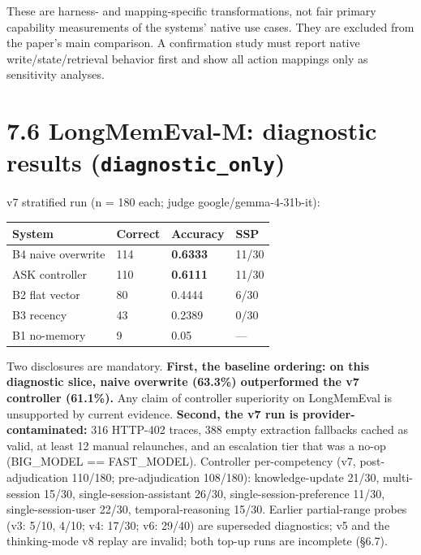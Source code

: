 These are harness- and mapping-specific transformations, not fair
primary capability measurements of the systems' native use cases. They
are excluded from the paper's main comparison. A confirmation study must
report native write/state/retrieval behavior first and show all action
mappings only as sensitivity analyses.

\section{\texorpdfstring{7.6 LongMemEval-M: diagnostic results
(\texttt{diagnostic\_only})}{7.6 LongMemEval-M: diagnostic results (diagnostic\_only)}}\label{longmemeval-m-diagnostic-results-diagnostic_only}

v7 stratified run (n = 180 each; judge google/gemma-4-31b-it):

{\def\LTcaptype{none} %
\begin{longtable}[]{@{}llll@{}}
\toprule\noalign{}
System & Correct & Accuracy & SSP \\
\midrule\noalign{}
\endhead
\bottomrule\noalign{}
\endlastfoot
B4 naive overwrite & 114 & \textbf{0.6333} & 11/30 \\
ASK controller & 110 & \textbf{0.6111} & 11/30 \\
B2 flat vector & 80 & 0.4444 & 6/30 \\
B3 recency & 43 & 0.2389 & 0/30 \\
B1 no-memory & 9 & 0.05 & --- \\
\end{longtable}
}

Two disclosures are mandatory. \textbf{First, the baseline ordering: on
this diagnostic slice, naive overwrite (63.3\%) outperformed the v7
controller (61.1\%).} Any claim of controller superiority on LongMemEval
is unsupported by current evidence. \textbf{Second, the v7 run is
provider-contaminated:} 316 HTTP-402 traces, 388 empty extraction
fallbacks cached as valid, at least 12 manual relaunches, and an
escalation tier that was a no-op (BIG\_MODEL == FAST\_MODEL). Controller
per-competency (v7, post-adjudication 110/180; pre-adjudication
108/180): knowledge-update 21/30, multi-session 15/30,
single-session-assistant 26/30, single-session-preference 11/30,
single-session-user 22/30, temporal-reasoning 15/30. Earlier
partial-range probes (v3: 5/10, 4/10; v4: 17/30; v6: 29/40) are
superseded diagnostics; v5 and the thinking-mode v8 replay are invalid;
both top-up runs are incomplete (§6.7).

